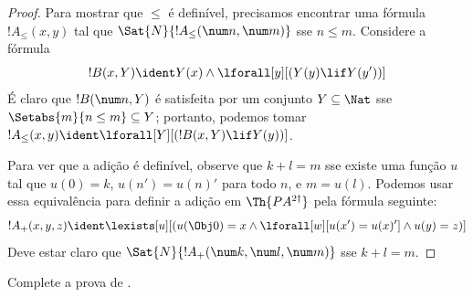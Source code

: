 \documentclass[../../../include/open-logic-section]{subfiles}
\begin{document}
\begin{proof}
Para mostrar que $\le$ é definível, precisamos encontrar uma
fórmula~$!A_\le(x, y)$ tal que $\Sat{N}{!A_\le(\num n, \num m)}$ sse
$n \le m$. Considere a fórmula
\[
!B(x, Y) \ident Y(x) \land \lforall[y][(Y(y) \lif Y(y'))]
\]
É claro que $!B(\num n, Y)$ é satisfeita por um conjunto
$Y \subseteq \Nat$ sse $\Setabs{m}{n \le m} \subseteq Y$; portanto,
podemos tomar $!A_\le(x, y) \ident
\lforall[Y][(!B(x, Y) \lif Y(y))]$.

Para ver que a adição é definível, observe que $k+l=m$ sse existe uma função
$u$ tal que $u(0)=k$, $u(n')=u(n)'$ para todo $n$, e $m = u(l)$. Podemos
usar essa equivalência para definir a adição em $\Th{PA^{2\dagger}}$ pela
fórmula seguinte:
\[
!A_+(x,y,z) \ident \lexists[u][(u(\Obj 0)=x \land \lforall[w][u(x')=u
 (x)'] \land u(y)=z)]
\] 
Deve estar claro que $\Sat{N}{!A_+(\num k, \num l, \num m)}$ sse
$k+l=m$.
\end{proof}

\begin{prob}
Complete a prova de .
\end{prob}
\end{document}
